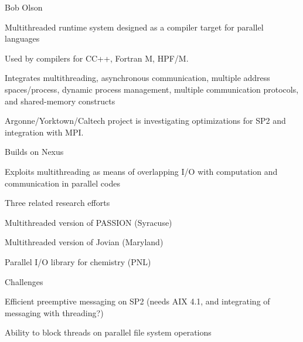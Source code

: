 \ve

Bob Olson
\ve


\begin{small}
\begin{mainpts}
\item Multithreaded runtime system designed as
  a compiler target for parallel languages

\item  Used by compilers for CC++, Fortran M, HPF/M.

\item  Integrates multithreading, asynchronous communication, multiple
  address spaces/process, dynamic process management, multiple
  communication protocols, and shared-memory constructs

\item  Argonne/Yorktown/Caltech project is investigating optimizations
  for SP2 and integration with MPI.
\end{mainpts}
\end{small}
\ve


\begin{small}
\begin{mainpts}
\item Builds on Nexus

\item Exploits multithreading as means of overlapping I/O with
  computation and communication in parallel codes

\item Three related research efforts
    \begin{secpts}
    \item Multithreaded version of PASSION (Syracuse)
    \item Multithreaded version of Jovian (Maryland)
    \item Parallel I/O library for chemistry (PNL)
    \end{secpts}

\item Challenges
    \begin{secpts}
    \item Efficient preemptive messaging on SP2 (needs AIX 4.1,
	and integrating of messaging with threading?)
    \item Ability to block threads on parallel file system
	operations
    \end{secpts}
\end{mainpts}
\end{small}
\ve

